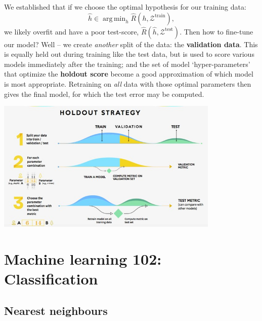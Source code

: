 \documentclass{article}
\DeclareMathOperator*{\argmin}{arg\,min}
\begin{document}
\begin{spexample}
    We established that if we choose the optimal hypothesis for our training data:
    \begin{equation}
        \hat{h} \in \argmin_{h}\hat{R}(h,\mathcal{Z}^\text{train}),
    \end{equation}
    we likely overfit and have a poor test-score, $\hat{R}(\hat{h},\mathcal{Z}^\text{test})$. Then how to fine-tune our model? Well -- we create \textit{another} split of the data: the \textbf{validation data}. This is equally held out during training like the test data, but is used to score various models immediately after the training; and the set of model `hyper-parameters' that optimize the \textbf{holdout score} become a good approximation of which model is most appropriate. Retraining on \textit{all} data with those optimal parameters then gives the final model, for which the test error may be computed.
    \begin{center}\includegraphics[width=0.8\textwidth]{holdout-strategy.jpg}\end{center}
\end{spexample}

\newpage
\section{Machine learning 102: Classification}
\subsection{Nearest neighbours}
\end{document}
